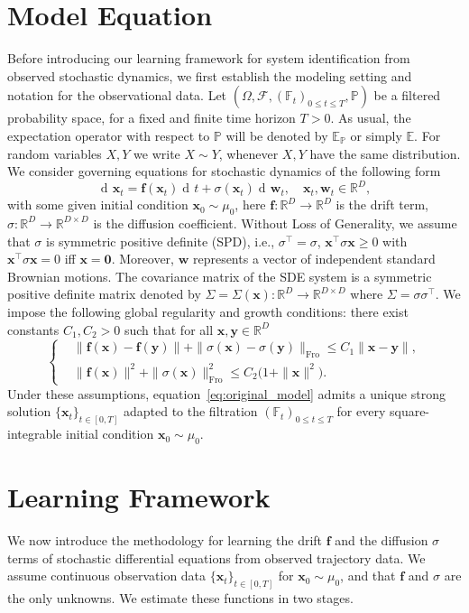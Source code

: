 \documentclass[11pt]{article} %
\def\eqref#1{equation~\ref{#1}}
\def\rvw{{\mathbf{w}}}
\def\rvx{{\mathbf{x}}}
\def\vf{{\bm{f}}}
\def\vx{{\bm{x}}}
\def\vy{{\bm{y}}}
\def\sF{{\mathbb{F}}}
\newcommand{\R}{\mathbb{R}}
\DeclareMathOperator{\dif}{d \!}        %
\begin{document}
\section{Model Equation}\label{sec:model}
%
Before introducing our learning framework for system identification from observed stochastic dynamics, we first establish the modeling setting and notation for the observational data.  Let $(\Omega,\mathcal{F},(\sF_{t})_{0\le t\le T},\mathbb{P})$ be a filtered probability space, for a fixed and  finite time horizon $T>0$.  As usual, the expectation operator with respect to $\mathbb{P}$ will be denoted by $\mathbb{E}_{\mathbb{P}}$ or simply $\mathbb{E}$. For random variables $X,Y$ we write $X\sim Y$, whenever $X,Y$ have the same distribution.  We consider governing equations for stochastic dynamics of the following form 
\begin{equation}\label{eq:original_model}
\dif \rvx_t = \vf(\rvx_t)\dif t + \sigma(\rvx_t) \dif \rvw_t, \quad \rvx_t, \rvw_t \in \R^D, 
\end{equation}
with some given initial condition $\rvx_0\sim \mu_0$, here $\vf: \R^D \rightarrow \R^D$ is the drift term, $\sigma: \R^D \rightarrow \R^{D \times D}$ is the diffusion coefficient.  Without Loss of Generality, we assume that $\sigma$ is symmetric positive definite (SPD), i.e., $\sigma^\intercal = \sigma$, $\rvx^\intercal\sigma\rvx \ge 0$ with $\rvx^\intercal\sigma\rvx = 0$ iff $\rvx = \mathbf{0}$.  Moreover, $\rvw$ represents a vector of independent standard Brownian motions. The covariance matrix of the SDE system is a symmetric positive definite matrix denoted by $\Sigma = \Sigma(\vx): \R^D \rightarrow \R^{D \times D}$ where $\Sigma = \sigma \sigma^\intercal$. We impose the following global regularity and growth conditions: there exist constants \(C_1, C_2 > 0\) such that for all \(\vx,\vy\in\R^{D}\)
\[
\begin{cases}
&\|\vf(\vx)-\vf(\vy)\|+\|\sigma(\vx)-\sigma(\vy)\|_{\mathrm{Fro}}
           \le C_1\|\vx-\vy\|, \\%
&\|\vf(\vx)\|^{2}+\|\sigma(\vx)\|_{\mathrm{Fro}}^{2}
           \le C_2\bigl(1+\|\vx\|^{2}\bigr). %
\end{cases}
\]
Under these assumptions, \eqref{eq:original_model} admits a unique strong solution \(\{\rvx_t\}_{t\in[0,T]}\) adapted to the filtration \((\sF_{t})_{0\le t\le T}\) for every square-integrable initial condition \(\rvx_0\sim\mu_0\). 
%
\section{Learning Framework}\label{sec:Learning Framework}
%
We now introduce the methodology for learning the drift $\vf$ and the diffusion $\sigma$ terms of stochastic differential equations from observed trajectory data.  We assume continuous observation data $\{\rvx_t\}_{t \in [0, T]}$ for $\rvx_0 \sim \mu_0$, and that $\vf$ and $\sigma$ are the only unknowns.  We estimate these functions in two stages.
%
\end{document}
